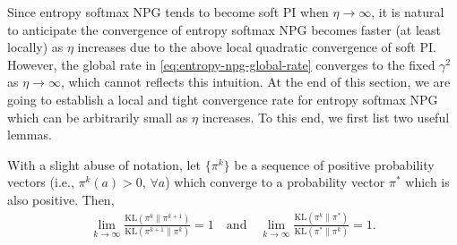 Since entropy softmax NPG tends to become soft PI when $\eta\rightarrow \infty$, it is natural to anticipate the convergence of entropy softmax NPG becomes faster (at least locally) as $\eta$ increases due to the above local quadratic convergence of soft PI. However, the global rate in \eqref{eq:entropy-npg-global-rate} converges to the fixed $\gamma^2$ as $\eta\rightarrow\infty$, which cannot reflects this intuition. At the end of this section, we are going to establish a local and tight convergence rate for entropy softmax NPG which can be arbitrarily small as $\eta$ increases. To this end, we first list two useful lemmas.

\begin{lemma}\label{lem:KL-ratio}
With a slight abuse of notation, let $\{\pi^k\}$ be a sequence of positive probability vectors \textup{(}i.e., $\pi^k(a)>0,\,\forall a$\textup{)} which converge to a probability vector $\pi^*$ which is also positive.  Then,
\begin{align*}
\lim_{k\rightarrow\infty}\frac{\mathrm{KL}(\pi^k\|\pi^{k+1})}{\mathrm{KL}(\pi^{{k+1}}\|\pi^{{k}})}=1\quad\mbox{and}\quad\lim_{k\rightarrow\infty}\frac{\mathrm{KL}(\pi^{k}\|\pi^{*})}{\mathrm{KL}(\pi^{*}\|\pi^{k})}=1.
\end{align*}
\end{lemma}

